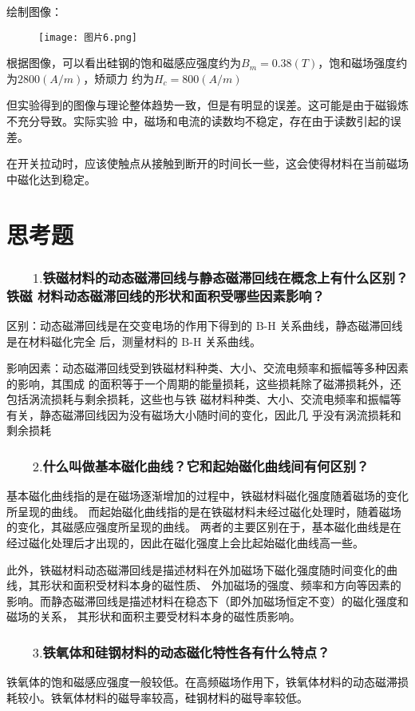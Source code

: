 \documentclass[12pt,a4paper]{article}
\begin{document}
绘制图像：
\begin{figure}[H]
    \centering
    \texttt{[image: 图片6.png]}
\end{figure}

根据图像，可以看出硅钢的饱和磁感应强度约为$B_m=0.38(T)$，饱和磁场强度约为$2800(A/m)$，矫顽力
约为$H_c=800(A/m)$

但实验得到的图像与理论整体趋势一致，但是有明显的误差。这可能是由于磁锻炼不充分导致。实际实验
中，磁场和电流的读数均不稳定，存在由于读数引起的误差。

在开关拉动时，应该使触点从接触到断开的时间长一些，这会使得材料在当前磁场中磁化达到稳定。

\section{思考题}
    \subsubsection*{$\qquad1.$铁磁材料的动态磁滞回线与静态磁滞回线在概念上有什么区别？铁磁
    材料动态磁滞回线的形状和面积受哪些因素影响？}
        区别：动态磁滞回线是在交变电场的作用下得到的 B-H 关系曲线，静态磁滞回线是在材料磁化完全
    后，测量材料的 B-H 关系曲线。\par
        影响因素：动态磁滞回线受到铁磁材料种类、大小、交流电频率和振幅等多种因素的影响，其围成
    的面积等于一个周期的能量损耗，这些损耗除了磁滞损耗外，还包括涡流损耗与剩余损耗，这些也与铁
    磁材料种类、大小、交流电频率和振幅等有关，静态磁滞回线因为没有磁场大小随时间的变化，因此几
    乎没有涡流损耗和剩余损耗

    \subsubsection*{$\qquad2.$什么叫做基本磁化曲线？它和起始磁化曲线间有何区别？}
    基本磁化曲线指的是在磁场逐渐增加的过程中，铁磁材料磁化强度随着磁场的变化所呈现的曲线。
    而起始磁化曲线指的是在铁磁材料未经过磁化处理时，随着磁场的变化，其磁感应强度所呈现的曲线。
    两者的主要区别在于，基本磁化曲线是在经过磁化处理后才出现的，因此在磁化强度上会比起始磁化曲线高一些。

    此外，铁磁材料动态磁滞回线是描述材料在外加磁场下磁化强度随时间变化的曲线，其形状和面积受材料本身的磁性质、
    外加磁场的强度、频率和方向等因素的影响。而静态磁滞回线是描述材料在稳态下（即外加磁场恒定不变）的磁化强度和磁场的关系，
    其形状和面积主要受材料本身的磁性质影响。

    \subsubsection*{$\qquad3.$铁氧体和硅钢材料的动态磁化特性各有什么特点？}
    铁氧体的饱和磁感应强度一般较低。在高频磁场作用下，铁氧体材料的动态磁滞损耗较小。铁氧体材料的磁导率较高，硅钢材料的磁导率较低。
\end{document}
